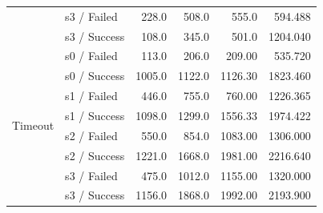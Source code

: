 \begin{table}[htbp]
\begin{tabular}{llrrrr}
		& s3 / Failed
		& 228.0 & 508.0 & 555.0 & 594.488 \\
		& s3 / Success
		& 108.0 & 345.0 & 501.0 & 1204.040 \\

		\midrule

		\multirow{10}{*}{Timeout}
		& s0 / Failed
		& 113.0 & 206.0 & 209.00 & 535.720 \\
		& s0 / Success
		& 1005.0 & 1122.0 & 1126.30 & 1823.460 \\

		& s1 / Failed
		& 446.0 & 755.0 & 760.00 & 1226.365 \\
		& s1 / Success
		& 1098.0 & 1299.0 & 1556.33 & 1974.422 \\

		& s2 / Failed
		& 550.0 & 854.0 & 1083.00 & 1306.000 \\
		& s2 / Success
		& 1221.0 & 1668.0 & 1981.00 & 2216.640 \\

		& s3 / Failed
		& 475.0 & 1012.0 & 1155.00 & 1320.000 \\
		& s3 / Success
		& 1156.0 & 1868.0 & 1992.00 & 2193.900 \\

		\bottomrule
	\end{tabular}
\end{table}